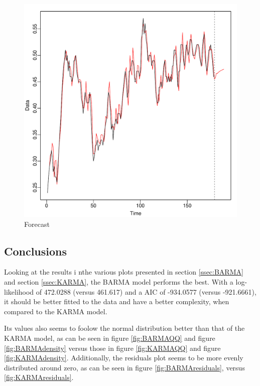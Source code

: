 \documentclass[12pt,a4paper,twoside]{article}
\begin{document}
\newpage
\begin{figure}[!ht]
    \centering
    \includegraphics[width=\textwidth]{img/KARMA-forecast.pdf}
    \caption{Forecast}
    \label{fig:KARMAForecast}
\end{figure}
\newpage
\subsection{Conclusions}
Looking at the results i nthe various plots presented in section \ref{ssec:BARMA} and section \ref{ssec:KARMA}, the BARMA model performs the best.
With a log-likelihood of 472.0288 (versus 461.617) and a AIC of -934.0577 (versus -921.6661), it should be better fitted to the data and have a
better complexity, when compared to the KARMA model.

Its values also seems to foolow the normal distribution better than that of the KARMA model, as can be seen in figure \ref{fig:BARMAQQ} and figure
\ref{fig:BARMAdensity} versus those in figure \ref{fig:KARMAQQ} and figure \ref{fig:KARMAdensity}. Additionally, the residuals plot seems to be more
evenly distributed around zero, as can be seen in figure \ref{fig:BARMAresiduals}, versus \ref{fig:KARMAresiduals}.
\end{document}

